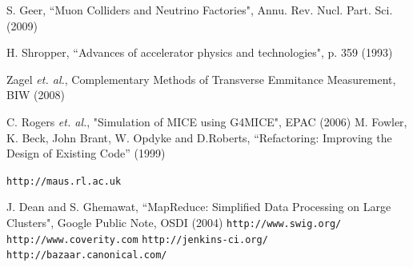 \documentclass{JAC2003}
\begin{document}
\begin{thebibliography}{9}   %

 S. Geer, ``Muon Colliders and Neutrino Factories", Annu. Rev. Nucl. Part. Sci. (2009)

 H. Shropper, ``Advances of accelerator physics and technologies", p. 359 (1993)

 Zagel \emph{et. al.}, Complementary Methods of Transverse Emmitance Measurement, BIW (2008)

 C. Rogers \emph{et. al.}, "Simulation of MICE using G4MICE", EPAC (2006)
M. Fowler, K. Beck, John Brant, W. Opdyke and D.Roberts, ``Refactoring: Improving the Design of Existing Code'' (1999)




 \texttt{http://maus.rl.ac.uk}

 J. Dean and S. Ghemawat, ``MapReduce: Simplified Data Processing on Large Clusters", Google Public Note, OSDI (2004)
 \texttt{http://www.swig.org/}
 \texttt{http://www.coverity.com}
 \texttt{http://jenkins-ci.org/}
 \texttt{http://bazaar.canonical.com/}
\end{thebibliography}
\end{document}
